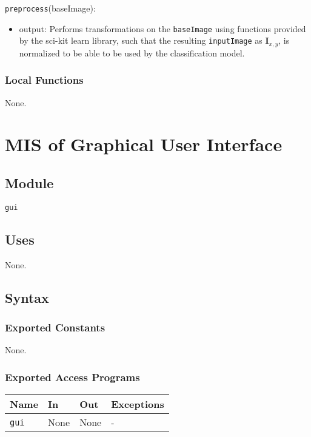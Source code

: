 \documentclass[12pt, titlepage]{article}
\def\code#1{\texttt{#1}}
\begin{document}
\noindent \code{preprocess}(baseImage):
\begin{itemize} 
\item output: Performs transformations on the \code{baseImage} using functions provided by the 
sci-kit learn library, such that the resulting \code{inputImage} 
as $\mathbf{I}_{x,y}$, is normalized to be able to be used by the classification model.
\end{itemize}

\subsubsection{Local Functions}

None.

\section{MIS of Graphical User Interface} \label{ModuleGUI} 

\subsection{Module}

\code{gui}

\subsection{Uses}

None.

\subsection{Syntax}

\subsubsection{Exported Constants}

None.

\subsubsection{Exported Access Programs}

\begin{center}
\begin{tabular}{p{2cm} p{4cm} p{4cm} p{2cm}}
\hline
\textbf{Name} & \textbf{In} & \textbf{Out} & \textbf{Exceptions} \\
\hline
\code{gui} & None & None & - \\
\hline
\end{tabular}
\end{center}
\end{document}
